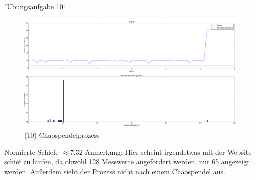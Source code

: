 \documentclass[fleqn,a4paper,12pt]{article}
\begin{document}
  "Ubungsaufgabe 10: \newline
  \begin{figure}
    \includegraphics[width=1.0\textwidth]{a10.png}
    \caption{(10) Chaospendelprozess}
  \end{figure}
  Normierte Schiefe $\approx 7.32$ \newline
  Anmerkung: Hier scheint irgendetwas mit der Website schief zu laufen, da obwohl 128 Messwerte angefordert werden, nur 65 angezeigt werden.
  Außerdem sieht der Prozess nicht nach einem Chaospendel aus.

  
\end{document}
